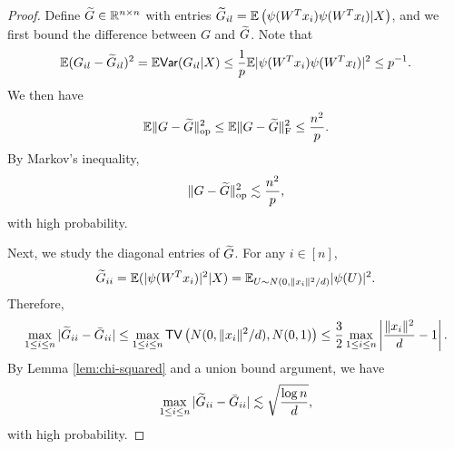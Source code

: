 \begin{proof}
Define $\widetilde{G}\in\mathbb{R}^{n\times n}$ with entries $\widetilde{G}_{il}=\mathbb{E}\left(\psi(W^Tx_i)\psi(W^Tx_l)|X\right)$, and we first bound the difference between $G$ and $\widetilde{G}$. Note that
$$\mathbb{E}(G_{il}-\widetilde{G}_{il})^2 = \mathbb{E}\textsf{Var}(G_{il}|X) \leq \frac{1}{p}\mathbb{E}|\psi(W^Tx_i)\psi(W^Tx_l)|^2 \leq p^{-1}.$$
We then have
$$
\mathbb{E}\|G-\widetilde{G}\|_{\rm op}^2 \leq \mathbb{E}\|G-\widetilde{G}\|_{\rm F}^2 \leq \frac{n^2}{p}.
$$
By Markov's inequality,
\begin{equation}
\opnorm{G-\wt{G}}^2 \lesssim \frac{n^2}{p}, \label{eq:G-G-tilde}
\end{equation}
with high probability.

Next, we study the diagonal entries of $\widetilde{G}$. For any $i\in[n]$,
$$\widetilde{G}_{ii}=\mathbb{E}(|\psi(W^Tx_i)|^2|X)=\mathbb{E}_{U\sim N(0,\|x_i\|^2/d)}|\psi(U)|^2.$$
Therefore,
$$\max_{1\leq i\leq n}|\widetilde{G}_{ii}-\bar{G}_{ii}|\leq \max_{1\leq i\leq n}{\sf TV}\left(N(0,\|x_i\|^2/d), N(0,1)\right)\leq\frac{3}{2}\max_{1\leq i\leq n}\left|\frac{\|x_i\|^2}{d}-1\right|.$$
By Lemma \ref{lem:chi-squared} and a union bound argument, we have
\begin{equation}
\max_{1\leq i\leq n}|\wt{G}_{ii}-\bar{G}_{ii}|\lesssim \sqrt{\frac{\log n}{d}}, \label{eq:G-diag}
\end{equation}
with high probability.


\end{proof}
